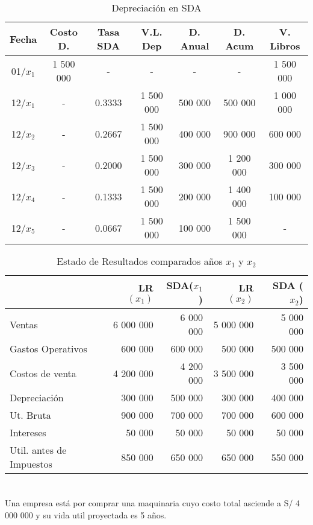 \documentclass[10pt,a4paper]{report}
\begin{document}
\begin{table}[h]
	\centering
	\caption{Depreciación en SDA}	
	
	\begin{tabular}{|c|c|c|c|c|c|c|} \hline
	
	Fecha    & Costo D.  & Tasa SDA & V.L. Dep  & D. Anual & D. Acum   & V. Libros \\ \hline

	01/$x_1$ & 1 500 000 & -        & -         & -        & -         & 1 500 000 \\ \hline

	12/$x_1$ & -         & 0.3333   & 1 500 000 & 500 000  & 500 000   & 1 000 000 \\ \hline

	12/$x_2$ & -         & 0.2667   & 1 500 000 & 400 000  & 900 000   & 600 000   \\ \hline

	12/$x_3$ & -         & 0.2000   & 1 500 000 & 300 000  & 1 200 000 & 300 000   \\ \hline

	12/$x_4$ & -         & 0.1333   & 1 500 000 & 200 000  & 1 400 000 & 100 000   \\ \hline

	12/$x_5$ & -         & 0.0667   & 1 500 000 & 100 000  & 1 500 000 & -         \\ \hline

	\end{tabular}
	\end{table}
	
	\begin{table}[h!]
	\centering
	\caption{Estado de Resultados comparados años $x_1$ y $x_2$}
	\begin{tabular}{l|r|r||r|r} 
	                          & LR $(x_1)$ & SDA($x_1$) & LR $(x_2)$ & SDA ($x_2$) \\ \hline
	 Ventas                   & 6 000 000  & 6 000 000  & 5 000 000  & 5 000 000   \\
	 Gastos Operativos        & 600 000    & 600 000    & 500 000    & 500 000     \\
	 Costos de venta          & 4 200 000  & 4 200 000  & 3 500 000  & 3 500 000   \\
	 Depreciación             & 300 000    & 500 000    & 300 000    & 400 000     \\ \hline
	 Ut. Bruta                & 900 000    & 700 000    & 700 000    & 600 000     \\
	 Intereses                & 50 000     & 50 000     & 50 000     & 50 000      \\ \hline
	 Util. antes de Impuestos & 850 000    & 650 000    & 650 000    & 550 000
 	\end{tabular}
	\end{table}	
	
\newpage %
\chapter{}
Una empresa está por comprar una maquinaria cuyo costo total asciende a S/ 4 000 000 y su vida util proyectada es 5 años.


	
\end{document}
